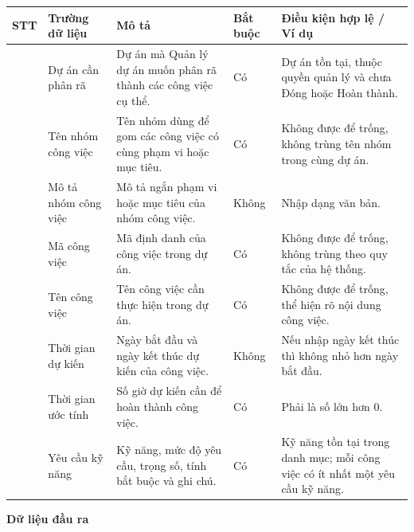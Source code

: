 \documentclass[../DoAn.tex]{subfiles}
\begin{document}
{\ucDataText
\begin{longtable}{|>{\centering\arraybackslash}p{}|>{\raggedright\arraybackslash}p{}|>{\raggedright\arraybackslash}p{}|>{\raggedright\arraybackslash}p{}|>{\raggedright\arraybackslash}p{}|}
\hline
\rowcolor{ucHeaderBg}\textbf{STT} & \textbf{Trường dữ liệu} & \textbf{Mô tả} & \textbf{Bắt buộc} & \textbf{Điều kiện hợp lệ / Ví dụ} \\ \hline
1 & Dự án cần phân rã & Dự án mà Quản lý dự án muốn phân rã thành các công việc cụ thể. & Có & Dự án tồn tại, thuộc quyền quản lý và chưa Đóng hoặc Hoàn thành. \\ \hline
2 & Tên nhóm công việc & Tên nhóm dùng để gom các công việc có cùng phạm vi hoặc mục tiêu. & Có & Không được để trống, không trùng tên nhóm trong cùng dự án. \\ \hline
3 & Mô tả nhóm công việc & Mô tả ngắn phạm vi hoặc mục tiêu của nhóm công việc. & Không & Nhập dạng văn bản. \\ \hline
4 & Mã công việc & Mã định danh của công việc trong dự án. & Có & Không được để trống, không trùng theo quy tắc của hệ thống. \\ \hline
5 & Tên công việc & Tên công việc cần thực hiện trong dự án. & Có & Không được để trống, thể hiện rõ nội dung công việc. \\ \hline
6 & Thời gian dự kiến & Ngày bắt đầu và ngày kết thúc dự kiến của công việc. & Không & Nếu nhập ngày kết thúc thì không nhỏ hơn ngày bắt đầu. \\ \hline
7 & Thời gian ước tính & Số giờ dự kiến cần để hoàn thành công việc. & Có & Phải là số lớn hơn 0. \\ \hline
8 & Yêu cầu kỹ năng & Kỹ năng, mức độ yêu cầu, trọng số, tính bắt buộc và ghi chú. & Có & Kỹ năng tồn tại trong danh mục; mỗi công việc có ít nhất một yêu cầu kỹ năng. \\ \hline
\end{longtable}
}

\textbf{Dữ liệu đầu ra}
\end{document}
